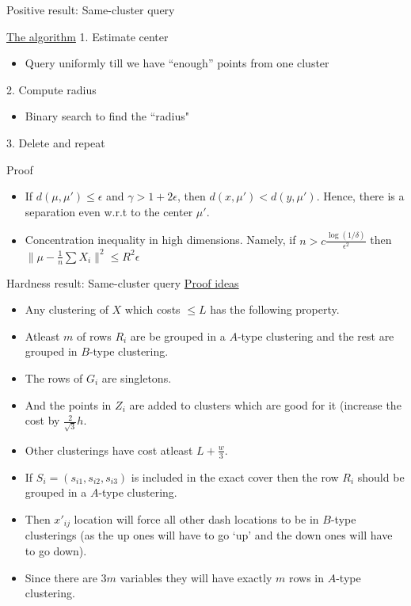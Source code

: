 \documentclass{beamer}
\begin{document}
\begin{frame}[label=resultQueryPositive]{Positive result: Same-cluster query}

	\begin{block}{\hyperlink{queryPositive}{The algorithm}}
	1. Estimate center
	\begin{itemize}
		\item Query uniformly till we have ``enough'' points from one cluster
    \end{itemize}  
	2. Compute radius
	\begin{itemize}
	  \item Binary search to find the ``radius"
    \end{itemize}  	
	3. Delete and repeat
  \end{block}
  Proof
  \begin{itemize}
	\item If $d(\mu, \mu') \le \epsilon$ and $\gamma > 1 + 2\epsilon$, then $d(x, \mu') < d(y, \mu')$. Hence, there is a separation even w.r.t to the center $\mu'$.

	\item Concentration inequality in high dimensions. Namely, if $n > c\frac{\log (1/\delta)}{\epsilon^2}$ then $\|\mu - \frac{1}{n}\sum X_i\|^2 \le R^2 \epsilon$ 
  \end{itemize}
\end{frame}

\begin{frame}[label=resultQueryNegative]{Hardness result: Same-cluster query}
\hyperlink{queryNegative}{Proof ideas}
\begin{itemize}
\item Any clustering of $X$ which costs $\le L$ has the following property. \item Atleast $m$ of rows $R_i$ are be grouped in a $A$-type clustering and the rest are grouped in $B$-type clustering. 
\item The rows of $G_i$ are singletons. 
\item And the points in $Z_i$ are added to clusters which are good for it (increase the cost by $\frac{2}{\sqrt{3}}h$. 
\item Other clusterings have cost atleast $L + \frac{w}{3}$. 
\item If $S_i = (s_{i1}, s_{i2}, s_{i3})$ is included in the exact cover then the row $R_i$ should be grouped in a $A$-type clustering. 
\item Then $x'_{ij}$ location will force all other dash locations to be in $B$-type clusterings (as the up ones will have to go `up' and the down ones will have to go down). 
\item Since there are $3m$ variables they will have exactly $m$ rows in $A$-type clustering.
\end{itemize}
\end{frame}
\end{document}
